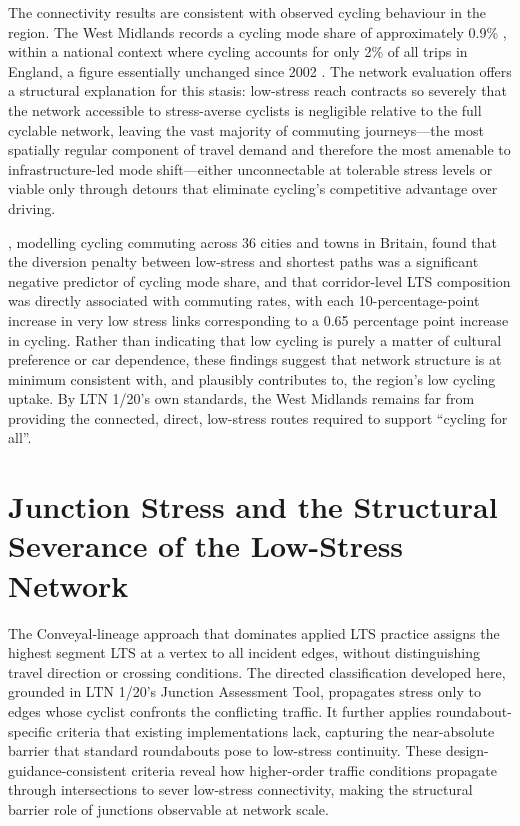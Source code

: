 The connectivity results are consistent with observed cycling behaviour in the region. The West Midlands records a cycling mode share of approximately 0.9\% \parencite{westmidlandscombinedauthority2024}, within a national context where cycling accounts for only 2\% of all trips in England, a figure essentially unchanged since 2002 \parencite{departmentfortransport2025}. The network evaluation offers a structural explanation for this stasis: low-stress reach contracts so severely that the network accessible to stress-averse cyclists is negligible relative to the full cyclable network, leaving the vast majority of commuting journeys---the most spatially regular component of travel demand and therefore the most amenable to infrastructure-led mode shift---either unconnectable at tolerable stress levels or viable only through detours that eliminate cycling's competitive advantage over driving.

\textcite{cervero2019}, modelling cycling commuting across 36 cities and towns in Britain, found that the diversion penalty between low-stress and shortest paths was a significant negative predictor of cycling mode share, and that corridor-level LTS composition was directly associated with commuting rates, with each 10-percentage-point increase in very low stress links corresponding to a 0.65 percentage point increase in cycling. Rather than indicating that low cycling is purely a matter of cultural preference or car dependence, these findings suggest that network structure is at minimum consistent with, and plausibly contributes to, the region's low cycling uptake. By LTN 1/20's own standards, the West Midlands remains far from providing the connected, direct, low-stress routes required to support ``cycling for all''.

\section{Junction Stress and the Structural Severance of the Low-Stress Network}
\label{sec:disc-junction}

The Conveyal-lineage approach that dominates applied LTS practice assigns the highest segment LTS at a vertex to all incident edges, without distinguishing travel direction or crossing conditions. The directed classification developed here, grounded in LTN 1/20's Junction Assessment Tool, propagates stress only to edges whose cyclist confronts the conflicting traffic. It further applies roundabout-specific criteria that existing implementations lack, capturing the near-absolute barrier that standard roundabouts pose to low-stress continuity. These design-guidance-consistent criteria reveal how higher-order traffic conditions propagate through intersections to sever low-stress connectivity, making the structural barrier role of junctions observable at network scale.

